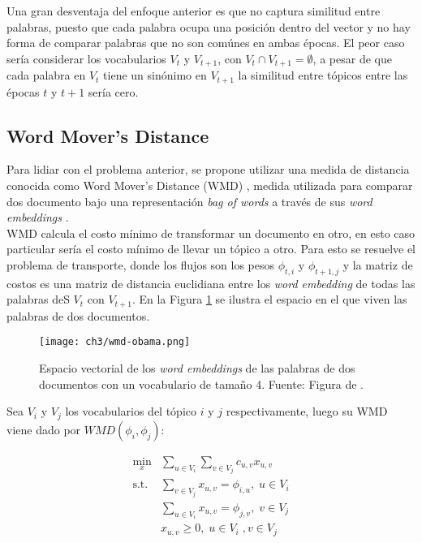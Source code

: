 Una gran desventaja del enfoque anterior es que no captura similitud entre palabras, puesto que cada palabra ocupa una posición dentro del vector y no hay forma de comparar palabras que no son comúnes en ambas épocas. El peor caso sería considerar los vocabularios $V_{t}$ y $V_{t+1}$, con $V_{t}\cap V_{t+1} =  \emptyset$, a pesar de que cada palabra en $V_{t}$ tiene un sinónimo en $V_{t+1}$ la similitud entre tópicos entre las épocas $t$ y $t+1$ sería cero.\\

\subsection{Word Mover's Distance}

Para lidiar con el problema anterior, se propone utilizar una medida de distancia conocida como Word Mover's Distance (WMD) \citep{kusner2015word}, medida utilizada para comparar dos documento bajo una representación \textit{bag of words} a través de sus \textit{word embeddings} \citep{mikolov2013distributed}.\\

WMD calcula el costo mínimo de transformar un documento en otro, en esto caso particular sería el costo mínimo de llevar un tópico a otro. Para esto se resuelve el problema de transporte, donde los flujos son los pesos $\phi_{t,i}$ y $\phi_{t+1,j}$ y la matriz de costos es una matriz de distancia euclidiana entre los \textit{word embedding} de todas las palabras deS $V_{t}$ con $V_{t+1}$. En la Figura \ref{img:wmd_obama} se ilustra el espacio en el que viven las palabras de dos documentos.

\begin{figure}
    \centering
    \texttt{[image: ch3/wmd-obama.png]}
    \caption{Espacio vectorial de los \textit{word embeddings} de las palabras de dos documentos con un vocabulario de tamaño 4. Fuente: Figura de \citep{WMDPy}.}
    \label{img:wmd_obama}
\end{figure}

Sea  $V_{i}$ y $V_{j}$ los vocabularios del tópico $i$ y $j$ respectivamente, luego su WMD viene dado por $WMD(\phi_{i}, \phi_{j})$:

\begin{align}
\underset{x}{\text{min}}&\sum_{u \in V_{i}}\sum_{v \in V_{j}} c_{u,v}x_{u,v} \\ 
\textrm{s.t.} &\sum_{v \in V_{j}}x_{u,v}= \phi_{i,u}, \; u \in V_{i}\\ 
& \sum_{u \in V_{i}}x_{u,v}= \phi_{j,v}, \; v\in V_{j}\\
& x_{u,v} \geq 0,\; u \in V_{i} \;, v \in V_{j}\\ \nonumber
\end{align}

